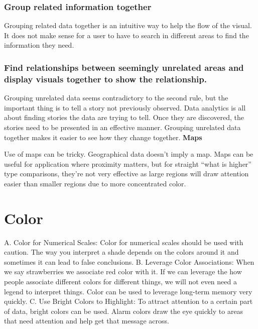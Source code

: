 \documentclass[]{book}
\theoremstyle{definition}
\theoremstyle{definition}
\theoremstyle{definition}
\theoremstyle{remark}
\begin{document}
\subsubsection{Group related information
together}\label{group-related-information-together-1}

Grouping related data together is an intuitive way to help the flow of
the visual. It does not make sense for a user to have to search in
different areas to find the information they need.

\subsubsection{Find relationships between seemingly unrelated areas and
display visuals together to show the
relationship.}\label{find-relationships-between-seemingly-unrelated-areas-and-display-visuals-together-to-show-the-relationship.-1}

Grouping unrelated data seems contradictory to the second rule, but the
important thing is to tell a story not previously observed. Data
analytics is all about finding stories the data are trying to tell. Once
they are discovered, the stories need to be presented in an effective
manner. Grouping unrelated data together makes it easier to see how they
change together. \textbf{Maps}

Use of maps can be tricky. Geographical data doesn't imply a map. Maps
can be useful for application where proximity matters, but for straight
``what is higher'' type comparisons, they're not very effective as large
regions will draw attention easier than smaller regions due to more
concentrated color.

\section{Color}\label{color}

A. Color for Numerical Scales: Color for numerical scales should be used
with caution. The way you interpret a shade depends on the colors around
it and sometimes it can lead to false conclusions. B. Leverage Color
Associations: When we say strawberries we associate red color with it.
If we can leverage the how people associate different colors for
different things, we will not even need a legend to interpret things.
Color can be used to leverage long-term memory very quickly. C. Use
Bright Colors to Highlight: To attract attention to a certain part of
data, bright colors can be used. Alarm colors draw the eye quickly to
areas that need attention and help get that message across.
\end{document}
